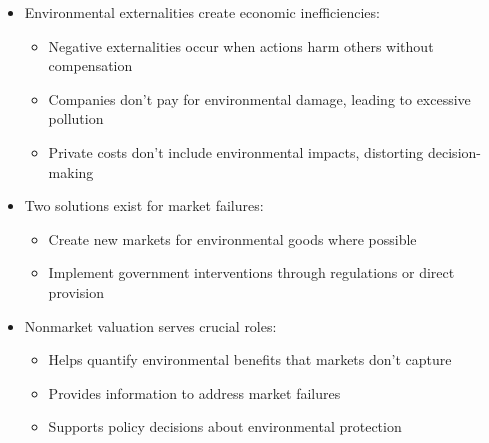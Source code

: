 \documentclass[
  ignorenonframetext,
]{beamer}
\providecommand{\tightlist}{%
  \setlength{\itemsep}{0pt}\setlength{\parskip}{0pt}}\usepackage{longtable,booktabs,array}
\begin{document}
\begin{frame}
\begin{itemize}
\tightlist
\item
  Environmental externalities create economic inefficiencies:

  \begin{itemize}
  \tightlist
  \item
    Negative externalities occur when actions harm others without
    compensation
  \item
    Companies don't pay for environmental damage, leading to excessive
    pollution
  \item
    Private costs don't include environmental impacts, distorting
    decision-making
  \end{itemize}
\item
  Two solutions exist for market failures:

  \begin{itemize}
  \tightlist
  \item
    Create new markets for environmental goods where possible
  \item
    Implement government interventions through regulations or direct
    provision
  \end{itemize}
\item
  Nonmarket valuation serves crucial roles:

  \begin{itemize}
  \tightlist
  \item
    Helps quantify environmental benefits that markets don't capture
  \item
    Provides information to address market failures
  \item
    Supports policy decisions about environmental protection
  \end{itemize}
\end{itemize}
\end{frame}
\end{document}
